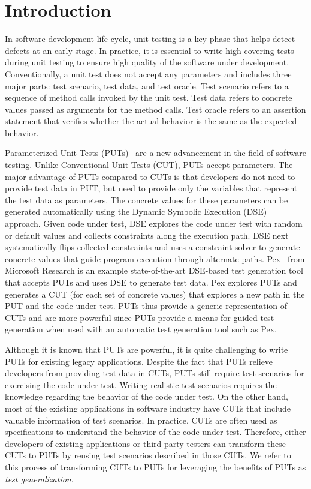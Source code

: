 \section{Introduction}
\label{sec:intro}

In software development life cycle, unit testing is a key phase that helps detect defects at an early stage. In practice, it is essential to write high-covering tests during unit testing to ensure high quality of the software under development. Conventionally, a unit test does not accept any parameters and includes three major parts: test scenario, test data, and test oracle. Test scenario refers to a sequence of method calls invoked by the unit test. Test data refers to concrete values passed as arguments for the method calls. Test oracle refers to an assertion statement that verifies whether the actual behavior is the same as the expected behavior. 

Parameterized Unit Tests (PUTs)~\cite{tillmann05:parameterized} are a new advancement in the field of software testing. Unlike Conventional Unit Tests (CUT), PUTs accept parameters. The major advantage of PUTs compared to CUTs is that developers do not need to provide test data in PUT, but need to provide only the variables that represent the test data as parameters. The concrete values for these parameters can be generated automatically using the Dynamic Symbolic Execution (DSE)~\cite{king:symex, godefroid05:dart, sen07:cute} approach. Given code under test, DSE explores the code under test with random or default values and collects constraints along the execution path. DSE next systematically flips collected constraints and uses a constraint solver to generate concrete values that guide program execution through alternate paths. Pex~\cite{tillmann08:pex, pex:rel} from Microsoft Research is an example state-of-the-art DSE-based test generation tool that accepts PUTs and uses DSE to generate test data. Pex explores PUTs and generates a CUT (for each set of concrete values) that explores a new path in the PUT and the code under test. PUTs thus provide a generic representation of CUTs and are more powerful since PUTs provide a means for guided test generation when used with an automatic test generation tool such as Pex. 

Although it is known that PUTs are powerful, it is quite challenging to write PUTs for existing legacy applications. Despite the fact that PUTs relieve developers from providing test data in CUTs, PUTs still require test scenarios for exercising the code under test. Writing realistic test scenarios requires the knowledge regarding the behavior of the code under test. On the other hand, most of the existing applications in software industry have CUTs that include valuable information of test scenarios. In practice, CUTs are often used as specifications to understand the behavior of the code under test. Therefore, either developers of existing applications or third-party testers can transform these CUTs to PUTs by reusing test scenarios described in those CUTs. We refer to this process of transforming CUTs to PUTs for leveraging the benefits of PUTs as \emph{test generalization}. %

